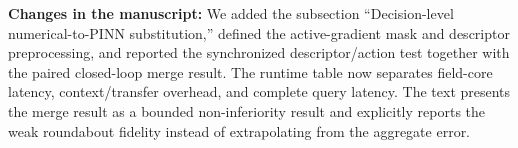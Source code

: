 \noindent\textbf{Changes in the manuscript:}
We added the subsection ``Decision-level numerical-to-PINN substitution,''
defined the active-gradient mask and descriptor preprocessing, and reported
the synchronized descriptor/action test together with the paired closed-loop
merge result. The runtime table now separates field-core latency,
context/transfer overhead, and complete query latency. The text presents the
merge result as a bounded non-inferiority result and explicitly reports the
weak roundabout fidelity instead of extrapolating from the aggregate error.
